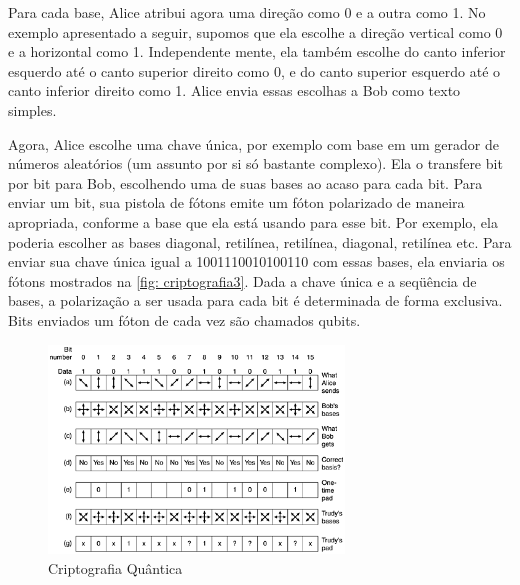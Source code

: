 Para cada base, Alice atribui agora uma direção como 0 e a outra como 1. No exemplo apresentado a seguir, supomos que ela escolhe a direção vertical como 0 e a horizontal como 1. Independente mente, ela também escolhe do canto inferior esquerdo até o canto superior direito como 0, e do canto superior esquerdo até o canto inferior direito como 1. Alice envia essas escolhas a Bob como texto simples.

Agora, Alice escolhe uma chave única, por exemplo com base em um gerador de números
aleatórios (um assunto por si só bastante complexo). Ela o transfere bit por bit para Bob,
escolhendo uma de suas bases ao acaso para cada bit. Para enviar um bit, sua pistola de fótons
emite um fóton polarizado de maneira apropriada, conforme a base que ela está usando para esse
bit. Por exemplo, ela poderia escolher as bases diagonal, retilínea, retilínea, diagonal, retilínea etc. Para enviar sua chave única igual a 1001110010100110 com essas bases, ela enviaria os fótons mostrados na \ref{fig: criptografia3}. Dada a chave única e a seqüência de bases, a polarização a ser usada para cada bit é determinada de forma exclusiva. Bits enviados um fóton de cada vez são chamados qubits.

\begin{figure}
	\begin{center}
		\includegraphics[width=0.7\textwidth]{criptografia4}
	\end{center}
	\caption{Criptografia Quântica ~\cite{tanenbaum}}
	\label{fig:criptografia4}
\end{figure}

